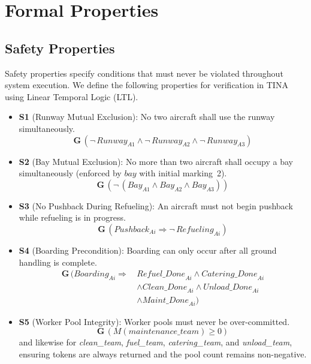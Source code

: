 \documentclass[conference]{IEEEtran}
\begin{document}
\FloatBarrier
\section{Formal Properties}

\subsection{Safety Properties}

Safety properties specify conditions that must never be violated throughout
system execution. We define the following properties for verification in TINA
using Linear Temporal Logic (LTL).

\begin{itemize}
  \item \textbf{S1} (Runway Mutual Exclusion): No two aircraft shall use the
    runway simultaneously.
    \[
      \mathbf{G}\,(\neg\,\mathit{Runway}_{A1} \wedge \neg\,\mathit{Runway}_{A2}
        \wedge \neg\,\mathit{Runway}_{A3})
    \]

  \item \textbf{S2} (Bay Mutual Exclusion): No more than two aircraft shall
    occupy a bay simultaneously (enforced by $\mathit{bay}$ with initial
    marking~2).
    \[
      \mathbf{G}\,(\neg\,(\mathit{Bay}_{A1} \wedge \mathit{Bay}_{A2}
        \wedge \mathit{Bay}_{A3}))
    \]

  \item \textbf{S3} (No Pushback During Refueling): An aircraft must not begin
    pushback while refueling is in progress.
    \[
      \mathbf{G}\,(\mathit{Pushback}_{Ai} \Rightarrow \neg\,\mathit{Refueling}_{Ai})
    \]

  \item \textbf{S4} (Boarding Precondition): Boarding can only occur after all
    ground handling is complete.
    \begin{align*}
      \mathbf{G}\,(\mathit{Boarding}_{Ai} \Rightarrow\, &\mathit{Refuel\_Done}_{Ai}
        \wedge \mathit{Catering\_Done}_{Ai}\\
        &\wedge \mathit{Clean\_Done}_{Ai} \wedge \mathit{Unload\_Done}_{Ai}\\
        &\wedge \mathit{Maint\_Done}_{Ai})
    \end{align*}

  \item \textbf{S5} (Worker Pool Integrity): Worker pools must never be
    over-committed.
    \[
      \mathbf{G}\,(M(\mathit{maintenance\_team}) \geq 0)
    \]
    and likewise for \textit{clean\_team}, \textit{fuel\_team},
    \textit{catering\_team}, and \textit{unload\_team}, ensuring tokens are
    always returned and the pool count remains non-negative.
\end{itemize}
\end{document}
